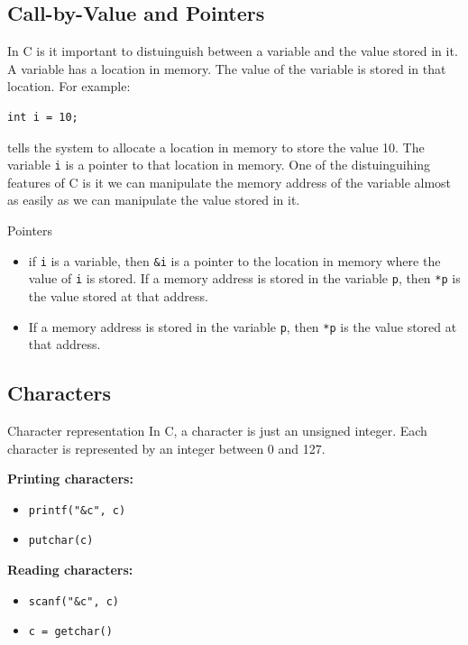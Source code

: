 \documentclass[a4paper, 10pt]{article}
\begin{document}
\subsection{Call-by-Value and Pointers}
In C is it important to distuinguish between a variable and the value stored in it. A variable has a location in memory. The value of the variable is stored in that location. For example:
\begin{lstlisting}[style=cStyle]
int i = 10;
\end{lstlisting}
tells the system to allocate a location in memory to store the value 10. The variable \texttt{i} is a pointer to that location in memory. One of the distuinguihing features of C is it we can manipulate the memory address of the variable almost as easily as we can manipulate the value stored in it.
\begin{conceptbox}{Pointers}{}
    \begin{itemize}
        \item if \texttt{i} is a variable, then \texttt{\&i} is a pointer to the location in memory where the value of \texttt{i} is stored.
              If a memory address is stored in the variable \texttt{p}, then \texttt{*p} is the value stored at that address.
        \item If a memory address is stored in the variable \texttt{p}, then \texttt{*p} is the value stored at that address.
    \end{itemize}
\end{conceptbox}

\subsection{Characters}
\begin{conceptbox}{Character representation}{}
    In C, a character is just an unsigned integer. Each character is represented by an integer between 0 and 127.
\end{conceptbox}

\begin{minipage}{0.45\textwidth}
    \textbf{Printing characters:}

    \begin{itemize}
        \item \texttt{printf("\&c", c)}
        \item \texttt{putchar(c)}
    \end{itemize}
\end{minipage}
\begin{minipage}{0.45\textwidth}
    \textbf{Reading characters:}
    \begin{itemize}
        \item \texttt{scanf("\&c", c)}
        \item \texttt{c = getchar()}
    \end{itemize}
\end{minipage}
\end{document}
